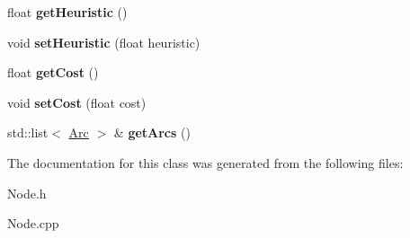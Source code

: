 \begin{DoxyCompactItemize}
float {\bfseries get\+Heuristic} ()
\item 
\mbox{\label{class_node_a3a05e781922425fe74d2774390883d56}} 
void {\bfseries set\+Heuristic} (float heuristic)
\item 
\mbox{\label{class_node_aed7dd991e4645d166a4e3770d459039a}} 
float {\bfseries get\+Cost} ()
\item 
\mbox{\label{class_node_a9d395cc5439fc53b7d9697f44108e137}} 
void {\bfseries set\+Cost} (float cost)
\item 
\mbox{\label{class_node_ad341bb693aadd335d8990b48b2cbb1f7}} 
std\+::list$<$ \mbox{\hyperlink{class_arc}{Arc}} $>$ \& {\bfseries get\+Arcs} ()
\end{DoxyCompactItemize}


The documentation for this class was generated from the following files\+:\begin{DoxyCompactItemize}
\item 
Node.\+h\item 
Node.\+cpp\end{DoxyCompactItemize}
